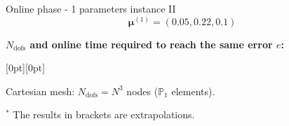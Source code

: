 \begin{frame}{Online phase - 1 parameters instance II}
	\vspace{-12pt}
	$$\bm{\mu}^{(1)}=(0.05, 0.22, 0.1) $$

	\textbf{$N_\text{dofs}$ and online time required to reach the same error $e$:}

	\begin{table}[ht!]
		\centering
	\end{table}
	\vspace{10pt}
	\hspace{285pt}\raisebox{0.25cm}[0pt][0pt]{}

	\begin{minipage}[t]{0.6\linewidth}
		Cartesian mesh: $N_\text{dofs} = N^3$ nodes ($\mathbb{P}_1$ elements).

		\vspace{10pt}
		\footnotesize
		$^*$ The results in brackets are extrapolations.
	\end{minipage} \hfill \begin{minipage}[t]{0.35\linewidth}
		\centering

		\vspace{15pt}
		\Large
	\end{minipage}
\end{frame}

